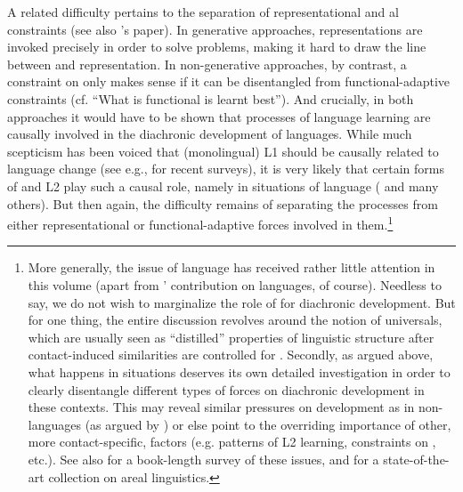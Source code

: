 \documentclass[output=paper]{langsci/langscibook}
\begin{document}
A related difficulty pertains to the separation of representational and al constraints (see also ’s paper). In generative approaches,  representations are invoked precisely in order to solve  problems, making it hard to draw the line between  and representation. In non-generative approaches, by contrast, a constraint on  only makes sense if it can be disentangled from functional-adaptive constraints (cf. “What is functional is learnt best”). And crucially, in both approaches it would have to be shown that processes of language learning are causally involved in the diachronic development of languages. While much scepticism has been voiced that (monolingual) L1  should be causally related to language change (see e.g., \citealt{Croft2000,HeineKuteva2007,Diessel2011_Acq} for recent surveys), it is very likely that certain forms of  and L2  play such a causal role, namely in situations of language  (\citealt{Matras2009,MeiselEtAl2013,Gast2017} and many others). But then again, the difficulty remains of separating the  processes from either representational or functional-adaptive forces involved in them.\footnote{More generally, the issue of language  has received rather little attention in this volume (apart from ’ contribution on  languages, of course). Needless to say, we do not wish to marginalize the role of  for diachronic development. But for one thing, the entire discussion revolves around the notion of universals, which are usually seen as “distilled” properties of linguistic structure after contact-induced similarities are controlled for \citep{Bickel2011_Modelling}. Secondly, as argued above, what happens in  situations deserves its own detailed investigation in order to clearly disentangle different types of forces on diachronic development in these contexts. This may reveal similar pressures on development as in non- languages (as argued by ) or else point to the overriding importance of other, more contact-specific, factors (e.g. patterns of L2 learning, constraints on , etc.). See also \citet{Matras2009} for a book-length survey of these issues, and \citet{Hickey2017} for a state-of-the-art collection on areal linguistics.}
\end{document}
